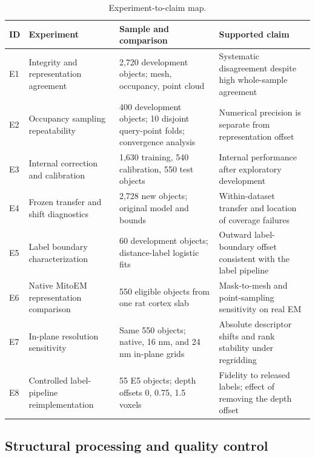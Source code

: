 \documentclass[journal]{IEEEtran}
\begin{document}
\begin{table}[!t]
\caption{Experiment-to-claim map.}
\label{tab:III}
\centering
\footnotesize
\setlength{\tabcolsep}{4pt}
\renewcommand{\arraystretch}{1.15}
\begin{tabularx}{\textwidth}{p{} Y Y Y}
\toprule
\textbf{ID} & \textbf{Experiment} & \textbf{Sample and comparison} & \textbf{Supported claim} \\
\midrule
E1 & Integrity and representation agreement & 2,720 development objects; mesh, occupancy, point cloud & Systematic disagreement despite high whole-sample agreement \\
E2 & Occupancy sampling repeatability & 400 development objects; 10 disjoint query-point folds; convergence analysis & Numerical precision is separate from representation offset \\
E3 & Internal correction and calibration & 1,630 training, 540 calibration, 550 test objects & Internal performance after exploratory development \\
E4 & Frozen transfer and shift diagnostics & 2,728 new objects; original model and bounds & Within-dataset transfer and location of coverage failures \\
E5 & Label boundary characterization & 60 development objects; distance-label logistic fits & Outward label-boundary offset consistent with the label pipeline \\
E6 & Native MitoEM representation comparison & 550 eligible objects from one rat cortex slab & Mask-to-mesh and point-sampling sensitivity on real EM \\
E7 & In-plane resolution sensitivity & Same 550 objects; native, 16 nm, and 24 nm in-plane grids & Absolute descriptor shifts and rank stability under regridding \\
E8 & Controlled label-pipeline reimplementation & 55 E5 objects; depth offsets 0, 0.75, 1.5 voxels & Fidelity to released labels; effect of removing the depth offset \\

\bottomrule\end{tabularx}\end{table}

\subsection{Structural processing and quality control}
\end{document}
